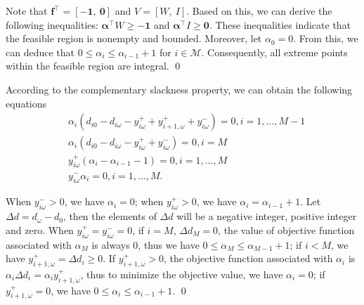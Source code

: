 \begin{pf}

Note that $\mathbf{f}^{\intercal} = [-\mathbf{1},~\mathbf{0}]$ and $V = [W,~I]$. Based on this, we can derive the following inequalities: $\bm{\alpha}^{\intercal}W \geq -\mathbf{1}$ and $\bm{\alpha}^{\intercal} I \geq \mathbf{0}$. These inequalities indicate that the feasible region is nonempty and bounded. Moreover, let $\alpha_0 = 0$. From this, we can deduce that $0 \leq \alpha_i \leq \alpha_{i-1} +1$ for $i \in \mathcal{M}$. Consequently, all extreme points within the feasible region are integral.
  \qed
\end{pf}

\begin{pf}
  According to the complementary slackness property, we can obtain the following equations
  \begin{align*}
    & \alpha_{i} (d_{i0} - d_{i \omega} - y_{i \omega}^{+} + y_{i+1, \omega}^{+} + y_{i \omega}^{-}) = 0, i =1,\ldots, M-1 \\
    & \alpha_{i} (d_{i0} - d_{i \omega} - y_{i \omega}^{+}+ y_{i \omega}^{-}) = 0, i = M \\
    & y_{i \omega}^{+}(\alpha_{i} - \alpha_{i-1}-1) = 0, i =1,\ldots, M \\
    & y_{i \omega}^{-} \alpha_{i} = 0, i =1,\ldots, M.
  \end{align*}
  
  When $y_{i \omega}^{-} >0$, we have $\alpha_{i} =0$; when $y_{i \omega}^{+} >0$, we have $\alpha_{i} = \alpha_{i-1} +1$.
  Let $\Delta d = d_{\omega} - d_0$, then the elements of $\Delta d$ will be a negative integer, positive integer and zero.
  When $y_{i \omega}^{+} = y_{i \omega}^{-} = 0$, if $i = M$, $\Delta d_{M} =0$, the value of objective function associated with $\alpha_{M}$ is always $0$, thus we have $0 \leq \alpha_{M} \leq \alpha_{M-1}+1$; if $i < M$, we have $y_{i+1, \omega}^{+} = \Delta d_{i} \geq 0$. If $y_{i+1, \omega}^{+} > 0$, the objective function associated with $\alpha_i$ is $\alpha_{i} \Delta d_{i} = \alpha_{i} y_{i+1, \omega}^{+}$, thus to minimize the objective value, we have $\alpha_i =0$; if $y_{i+1, \omega}^{+} = 0$, we have $0 \leq \alpha_{i} \leq \alpha_{i-1} +1$.
  \qed
  \end{pf}

